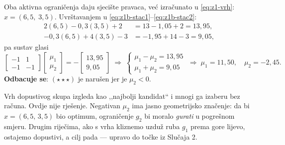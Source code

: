 \begin{korak}
Oba aktivna ograničenja daju sjecište pravaca, već izračunato u
\eqref{eq:z1-vrh}: $x = (6{,}5,\; 3{,}5)$. Uvrštavanjem u
\eqref{eq:z1b-stac1}--\eqref{eq:z1b-stac2}:
\begin{align}
2(6{,}5) - 0{,}3(3{,}5) + 2 &= 13 - 1{,}05 + 2 = 13{,}95, \\
-0{,}3(6{,}5) + 4(3{,}5) - 3 &= -1{,}95 + 14 - 3 = 9{,}05,
\end{align}
pa sustav glasi
\begin{equation}
\begin{bmatrix} -1 & 1 \\ -1 & -1 \end{bmatrix}
\begin{bmatrix} \mu_1 \\ \mu_2 \end{bmatrix}
= -\begin{bmatrix} 13{,}95 \\ 9{,}05 \end{bmatrix}
\;\Longrightarrow\;
\begin{cases} \mu_1 - \mu_2 = 13{,}95 \\ \mu_1 + \mu_2 = 9{,}05 \end{cases}
\;\Longrightarrow\;
\mu_1 = 11{,}50, \quad \mu_2 = -2{,}45 .
\end{equation}
\textbf{Odbacuje se}: $(\star\star\star)$ je narušen jer je $\mu_2 < 0$.
\end{korak}

\begin{zamka}
Vrh dopustivog skupa izgleda kao ,,najbolji kandidat`` i mnogi ga izaberu bez
računa. Ovdje nije rješenje. Negativan $\mu_2$ ima jasno geometrijsko značenje:
da bi $x = (6{,}5,\, 3{,}5)$ bio optimum, ograničenje $g_2$ bi moralo \emph{gurati}
u pogrešnom smjeru. Drugim riječima, ako s vrha kliznemo uzduž ruba $g_1$ prema
gore lijevo, ostajemo dopustivi, a cilj pada --- upravo do točke iz Slučaja 2.
\end{zamka}

